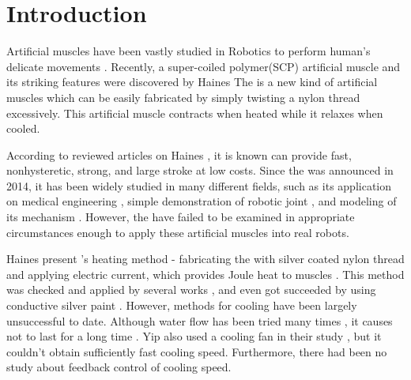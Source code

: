 
\section{Introduction}
Artificial muscles have been vastly studied in Robotics to perform human's delicate movements \cite{ashley}. Recently, a super-coiled polymer(SCP) artificial muscle and its striking features were discovered by Haines \etal \cite{haines} The \scp is a new kind of artificial muscles which can be easily fabricated by simply twisting a nylon thread excessively. This artificial muscle contracts when heated while it relaxes when cooled.

According to reviewed articles on Haines \etal \cite{haines}, 
it is known \scps can provide fast, nonhysteretic, strong, and large stroke at low costs\cite{yuan, madden}. 
Since the \scp was announced in 2014, it has been widely studied in many different fields, such as its application on
medical engineering \cite{sphincter}, 
simple demonstration of robotic joint \cite{finger},
and modeling of its mechanism \cite{yip}.
However, the \scps have failed to be examined in appropriate circumstances enough to apply these artificial muscles into real robots.

Haines \etalspace present \scpnospace's heating method - fabricating the \scps with silver coated nylon thread and applying electric current, which provides Joule heat to muscles \cite{haines}. This method was checked and applied by several works \cite{yip, sphincter}, and even got succeeded by using conductive silver paint \cite{mirvakili}. However, methods for cooling \scps have been largely unsuccessful to date. 
Although water flow has been tried many times \cite{haines,finger},
it causes \scps not to last for a long time \cite{haines}.
Yip \etalspace also used a cooling fan in their study \cite{yip}, but it couldn't obtain sufficiently fast cooling speed.
Furthermore, there had been no study about feedback control of cooling speed.


